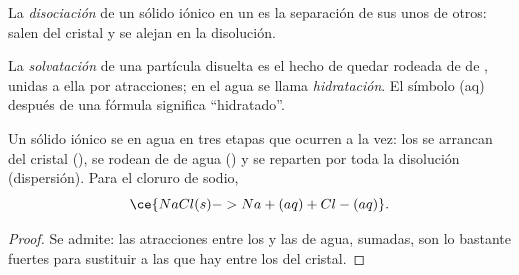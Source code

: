 \begin{definition}[Disociación]\label{def:g11:dissolution:dissociation}
La \emph{disociación} de un sólido iónico en un
 es la separación de sus  unos de otros: salen del
cristal y se alejan en la disolución.
\end{definition}

\begin{definition}\label{def:g11:dissolution:solvation}
La \emph{solvatación} de una partícula disuelta es el
hecho de quedar rodeada de  de , unidas a ella por
atracciones; en el agua se llama
\emph{hidratación}. El símbolo (aq) después de una
fórmula significa ``hidratado''.
\end{definition}

\begin{proposition}\label{prop:g11:dissolution:stages}
Un sólido iónico se  en agua en tres etapas que ocurren a la
vez: los  se arrancan del cristal (), se rodean de
 de agua () y se reparten por toda la disolución
(dispersión). Para el cloruro de sodio,
\[
  \ce{NaCl(s) -> Na+(aq) + Cl-(aq)} .
\]
\end{proposition}

\begin{proof}
Se admite: las atracciones entre los  y las  de
agua, sumadas, son lo bastante fuertes para sustituir a las que hay
entre los  del cristal.
\end{proof}


